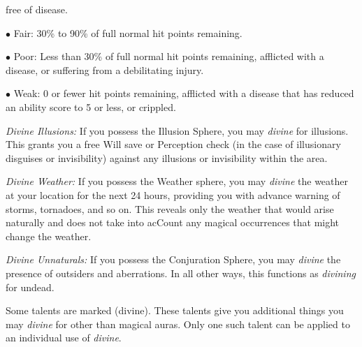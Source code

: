 {		free of disease.
		\par$\bullet$ Fair: 30\% to 90\% of full normal hit points remaining.
		\par$\bullet$ Poor: Less than 30\% of full normal hit points remaining, afflicted with a disease, or suffering from a debilitating injury.
		\par$\bullet$ Weak: 0 or fewer hit points remaining, afflicted with a disease that has reduced an ability score to 5 or less, or crippled.\par
	\textit{Divine Illusions:} If you possess the Illusion Sphere, you may \textit{divine} for illusions. This grants you a free Will save or Perception check (in the case of illusionary disguises or invisibility) against any illusions or invisibility within the area.\par
	\textit{Divine Weather:} If you possess the Weather sphere, you may \textit{divine} the weather at your location for the next 24 hours, providing you with advance warning of storms, tornadoes, and so on. This reveals only the weather that would arise naturally and does not take into acCount any magical occurrences that might change the weather.\par
	\textit{Divine Unnaturals:} If you possess the Conjuration Sphere, you may \textit{divine} the presence of outsiders and aberrations. In all other ways, this functions as  \textit{divining} for undead.\par
	Some talents are marked (divine). These talents give you additional things you may \textit{divine} for other than magical auras. Only one such talent can be applied to an individual use of \textit{divine}.}
